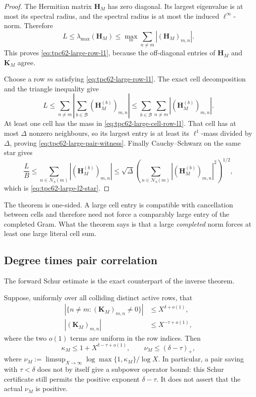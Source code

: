 \begin{proof}
The Hermitian matrix \(\mathbf H_M\) has zero diagonal.  Its largest
eigenvalue is at most its spectral radius, and the spectral radius is at
most the induced \(\ell^\infty\)-norm.  Therefore
\[
 L
 \le\lambda_{\max}(\mathbf H_M)
 \le\max_m\sum_{n\ne m}|(\mathbf H_M)_{m,n}|.
\]
This proves \eqref{eq:tpc62-large-row-l1}, because the off-diagonal entries
of \(\mathbf H_M\) and \(\mathbf K_M\) agree.

Choose a row \(m\) satisfying \eqref{eq:tpc62-large-row-l1}.  The exact
cell decomposition and the triangle inequality give
\[
 L
 \le\sum_{n\ne m}\left|
       \sum_{b\in\mathscr B}(\mathbf H_M^{(b)})_{m,n}\right|
 \le\sum_{b\in\mathscr B}\sum_{n\ne m}
       |(\mathbf H_M^{(b)})_{m,n}|.
\]
At least one cell has the mass in
\eqref{eq:tpc62-large-cell-row-l1}.  That cell has at most \(\Delta\)
nonzero neighbours, so its largest entry is at least its \(\ell^1\)-mass
divided by \(\Delta\), proving
\eqref{eq:tpc62-large-pair-witness}.  Finally Cauchy--Schwarz on the same
star gives
\[
 \frac{L}{B}
 \le\sum_{n\in\mathcal N_b(m)}
       |(\mathbf H_M^{(b)})_{m,n}|
 \le\sqrt{\Delta}
 \left(\sum_{n\in\mathcal N_b(m)}
       |(\mathbf H_M^{(b)})_{m,n}|^2\right)^{1/2},
\]
which is \eqref{eq:tpc62-large-l2-star}.
\end{proof}

The theorem is one-sided.  A large cell entry is compatible with
cancellation between cells and therefore need not force a comparably large
entry of the completed Gram.  What the theorem says is that a large
\emph{completed} norm forces at least one large literal cell sum.

\subsection{Degree times pair correlation}

The forward Schur estimate is the exact counterpart of the inverse theorem.

\begin{corollary}
\label{cor:tpc62-degree-pair-exponent}
Suppose, uniformly over all colliding distinct active rows, that
\begin{align}
 |\{n\ne m:(\mathbf K_M)_{m,n}\ne0\}|
 &\le X^{\delta+o(1)},
 \label{eq:tpc62-global-degree-exponent}\\
 |(\mathbf K_M)_{m,n}|
 &\le X^{-\tau+o(1)},
 \label{eq:tpc62-pair-correlation-exponent}
\end{align}
where the two \(o(1)\) terms are uniform in the row indices.  Then
\begin{equation}
 \boxed{
 \kappa_M
 \le 1+X^{\delta-\tau+o(1)},
 \qquad
 \nu_M\le(\delta-\tau)_+,}
 \label{eq:tpc62-degree-pair-kappa-bound}
\end{equation}
where
\(
 \nu_M:=\limsup_{X\to\infty}
 \log\max\{1,\kappa_M\}/\log X
\).
In particular, a pair saving with \(\tau<\delta\) does not by itself give
a subpower operator bound: this Schur certificate still permits the
positive exponent \(\delta-\tau\).  It does not assert that the actual
\(\nu_M\) is positive.
\end{corollary}

